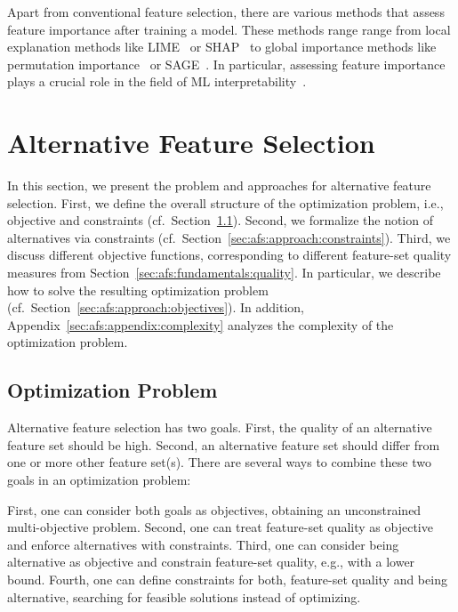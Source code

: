 \documentclass{article}
\theoremstyle{definition}
\begin{document}
Apart from conventional feature selection, there are various methods that assess feature importance after training a model.
These methods range range from local explanation methods like LIME~\cite{ribeiro2016should} or SHAP~\cite{lundberg2017unified} to global importance methods like permutation importance~\cite{breiman2001random} or SAGE~\cite{covert2020understanding}.
In particular, assessing feature importance plays a crucial role in the field of ML interpretability~\cite{carvalho2019machine, molnar2020interpretable}.

\section{Alternative Feature Selection}
\label{sec:afs:approach}

In this section, we present the problem and approaches for alternative feature selection.
First, we define the overall structure of the optimization problem, i.e., objective and constraints (cf.~Section~\ref{sec:afs:approach:problem}).
Second, we formalize the notion of alternatives via constraints (cf.~Section~\ref{sec:afs:approach:constraints}).
Third, we discuss different objective functions, corresponding to different feature-set quality measures from Section~\ref{sec:afs:fundamentals:quality}.
In particular, we describe how to solve the resulting optimization problem (cf.~Section~\ref{sec:afs:approach:objectives}).
In addition, Appendix~\ref{sec:afs:appendix:complexity} analyzes the complexity of the optimization problem.

\subsection{Optimization Problem}
\label{sec:afs:approach:problem}

Alternative feature selection has two goals.
First, the quality of an alternative feature set should be high.
Second, an alternative feature set should differ from one or more other feature set(s).
There are several ways to combine these two goals in an optimization problem:

First, one can consider both goals as objectives, obtaining an unconstrained multi-objective problem.
Second, one can treat feature-set quality as objective and enforce alternatives with constraints.
Third, one can consider being alternative as objective and constrain feature-set quality, e.g., with a lower bound.
Fourth, one can define constraints for both, feature-set quality and being alternative, searching for feasible solutions instead of optimizing.
\end{document}
